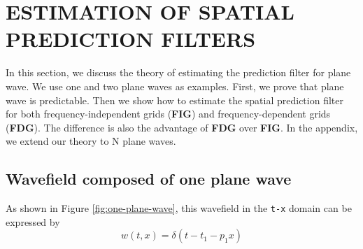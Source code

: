  
\section{ESTIMATION OF SPATIAL PREDICTION FILTERS}

\par
In this section, we discuss the theory of estimating the prediction filter for 
plane wave. We use one and two plane waves as examples. First, we prove that 
plane wave is predictable. Then we show how to estimate the spatial prediction 
filter for both frequency-independent grids ({\bf FIG}) and frequency-dependent
 grids ({\bf FDG}). 
The difference is also the advantage of {\bf FDG} over {\bf FIG}. In the 
appendix, we extend our theory to N plane waves. 
\subsection{Wavefield composed of one plane wave}

\par
As shown in Figure \ref{fig:one-plane-wave}, this wavefield in the {\tt t-x} domain
 can be expressed by
\begin{equation}
	w(t,x) = \delta (t-t_1-p_1x)
\end{equation}


